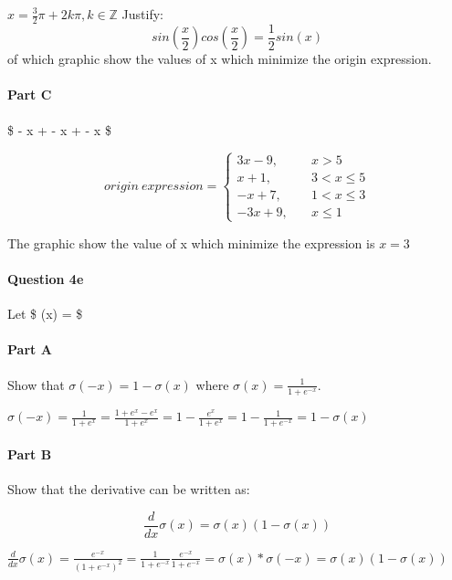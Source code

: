 \documentclass[11pt]{article}
\begin{document}
    \(x=\frac{3}{2}\pi+2k\pi, k\in \mathbb{Z}\)
Justify:\[sin(\frac{x}{2})cos(\frac{x}{2})=\frac{1}{2}sin(x)\] of which
graphic show the values of x which minimize the origin expression.

    \paragraph{Part C}\label{part-c}

\$  - x \vert +  - x \vert +  - x \vert \$

    \begin{equation}
origin\ expression=\left\{
\begin{aligned}
3x-9,\quad & x>5 \\
x+1,\quad & 3<x\leq5 \\
-x+7,\quad & 1<x\leq3 \\
-3x+9,\quad & x\leq1
\end{aligned}
\right.
\end{equation}

The graphic show the value of x which minimize the expression is \(x=3\)

    \paragraph{Question 4e}\label{question-4e}

Let \$ \sigma(x) =  \$

    \paragraph{Part A}\label{part-a}

Show that \(\sigma(-x) = 1 - \sigma(x)\) where
\(\sigma(x) = \frac{1}{1+e^{-x}}\).

    \(\sigma(-x)=\frac{1}{1+e^x}=\frac{1+e^x-e^x}{1+e^x}=1-\frac{e^x}{1+e^x}=1-\frac{1}{1+e^{-x}}=1-\sigma(x)\)

    \paragraph{Part B}\label{part-b}

Show that the derivative can be written as:

\[\frac{d}{dx}\sigma(x) = \sigma(x)(1 - \sigma(x)) \]

    \(\frac{d}{dx}\sigma(x)=\frac{e^{-x}}{(1+e^{-x})^2}=\frac{1}{1+e^{-x}}\frac{e^{-x}}{1+e^{-x}}=\sigma(x)*\sigma(-x)= \sigma(x)(1 - \sigma(x))\)
\end{document}

